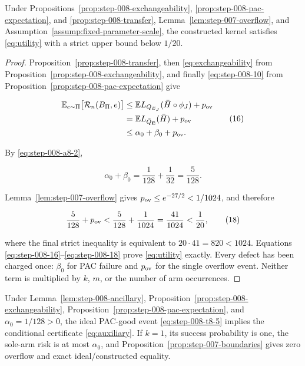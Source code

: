 \begin{proposition}
\label{prop:step-008-utility}

Under Propositions~\ref{prop:step-008-exchangeability},
\ref{prop:step-008-pac-expectation}, and
\ref{prop:step-008-transfer}, 
Lemma~\ref{lem:step-007-overflow}, and
Assumption~\ref{assump:fixed-parameter-scale}, the constructed kernel
satisfies \eqref{eq:utility} with a strict upper bound below \(1/20\).

\end{proposition}

\begin{proof}

Proposition~\ref{prop:step-008-transfer}, then \eqref{eq:exchangeability} from
Proposition~\ref{prop:step-008-exchangeability}, and finally \eqref{eq:step-008-10} from
Proposition~\ref{prop:step-008-pac-expectation} give

\[
\begin{aligned}
\mathbb E_{e\sim\Pi}\bigl[\mathcal R_n(B_\Pi,e)\bigr]
&\le
\mathbb E L_{Q_{E_J}}(\bar H\circ\phi_J)+p_{\rm ov}\\
&=
\mathbb E L_{\bar Q_{\mathbf E}}(\bar H)+p_{\rm ov}\\
&\le\alpha_0+\beta_0+p_{\rm ov}.
\end{aligned}
\tag{16}\label{eq:step-008-16}
\]

By \eqref{eq:step-008-a8-2},

\[
\alpha_0+\beta_0
=\frac1{128}+\frac1{32}
=\frac5{128}.
\tag{17}\label{eq:step-008-17}
\]

Lemma~\ref{lem:step-007-overflow} gives
\(p_{\rm ov}\le e^{-27/2}<1/1024\), and therefore

\[
\frac5{128}+p_{\rm ov}
<\frac5{128}+\frac1{1024}
=\frac{41}{1024}
<\frac1{20},
\tag{18}\label{eq:step-008-18}
\]

where the final strict inequality is equivalent to
\(20\cdot41=820<1024\).  Equations \eqref{eq:step-008-16}--\eqref{eq:step-008-18} prove \eqref{eq:utility} exactly.
Every defect has been charged once: \(\beta_0\) for PAC failure and
\(p_{\rm ov}\) for the single overflow event.  Neither term is
multiplied by \(k\), \(m\), or the number of arm occurrences.

\end{proof}


\begin{proposition}
\label{prop:step-008-auxiliary}

Under Lemma~\ref{lem:step-008-ancillary},
Proposition~\ref{prop:step-008-exchangeability},
Proposition~\ref{prop:step-008-pac-expectation}, and
\(\alpha_0=1/128>0\), the ideal PAC-good event \eqref{eq:step-008-t8-5} implies the
conditional certificate \eqref{eq:auxiliary}.  If \(k=1\), its success probability
is one, the sole-arm risk is at most \(\alpha_0\), and 
Proposition~\ref{prop:step-007-boundaries} gives zero overflow and exact
ideal/constructed equality.

\end{proposition}

